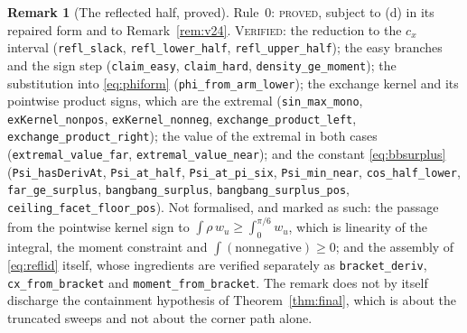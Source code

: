 \documentclass[11pt]{article}
\theoremstyle{definition}
\newtheorem{remark}[theorem]{Remark}
\begin{document}
\begin{remark}[The reflected half, proved]
Rule~0: \textsc{proved}, subject to (d) in its repaired form and to Remark~\ref{rem:v24}.
\textsc{Verified}: the reduction to the $c_x$ interval (\verb|refl_slack|,
\verb|refl_lower_half|, \verb|refl_upper_half|); the easy branches and the sign step
(\verb|claim_easy|, \verb|claim_hard|, \verb|density_ge_moment|); the substitution into
\eqref{eq:phiform} (\verb|phi_from_arm_lower|); the exchange kernel and its pointwise product
signs, which are the extremal (\verb|sin_max_mono|, \verb|exKernel_nonpos|,
\verb|exKernel_nonneg|, \verb|exchange_product_left|, \verb|exchange_product_right|); the
value of the extremal in both cases (\verb|extremal_value_far|, \verb|extremal_value_near|);
and the constant \eqref{eq:bbsurplus} (\verb|Psi_hasDerivAt|, \verb|Psi_at_half|,
\verb|Psi_at_pi_six|, \verb|Psi_min_near|, \verb|cos_half_lower|, \verb|far_ge_surplus|,
\verb|bangbang_surplus|, \verb|bangbang_surplus_pos|, \verb|ceiling_facet_floor_pos|). Not
formalised, and marked as such: the passage from the pointwise kernel sign to
$\int\rho\,w_u\ge\int_0^{\pi/6}w_u$, which is linearity of the integral, the moment
constraint and $\int(\text{nonnegative})\ge0$; and the assembly of \eqref{eq:reflid} itself,
whose ingredients are verified separately as \verb|bracket_deriv|, \verb|cx_from_bracket| and
\verb|moment_from_bracket|. The remark does not by itself discharge the containment
hypothesis of Theorem~\ref{thm:final}, which is about the truncated sweeps and not about the
corner path alone.
\end{remark}
\end{document}
